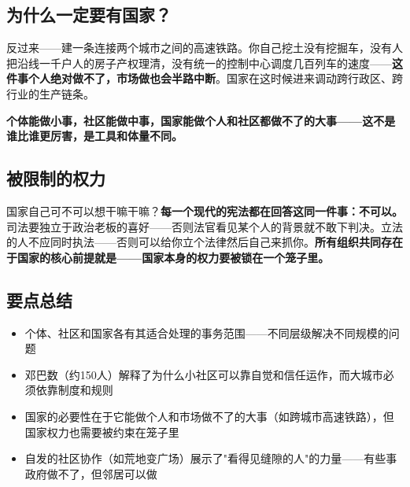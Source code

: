 \documentclass[a4paper,12pt]{ctexart}
\begin{document}
\subsection*{为什么一定要有国家？}

反过来——建一条连接两个城市之间的高速铁路。你自己挖土没有挖掘车，没有人把沿线一千户人的房子产权理清，没有统一的控制中心调度几百列车的速度——\textbf{这件事个人绝对做不了，市场做也会半路中断}。国家在这时候进来调动跨行政区、跨行业的生产链条。

\textbf{个体能做小事，社区能做中事，国家能做个人和社区都做不了的大事——这不是谁比谁更厉害，是工具和体量不同。}


\subsection*{被限制的权力}

国家自己可不可以想干嘛干嘛？\textbf{每一个现代的宪法都在回答这同一件事：不可以。}司法要独立于政治老板的喜好——否则法官看见某个人的背景就不敢下判决。立法的人不应同时执法——否则可以给你立个法律然后自己来抓你。\textbf{所有组织共同存在于国家的核心前提就是——国家本身的权力要被锁在一个笼子里。}

\subsection*{要点总结}
\begin{itemize}
  \item 个体、社区和国家各有其适合处理的事务范围——不同层级解决不同规模的问题
  \item 邓巴数（约150人）解释了为什么小社区可以靠自觉和信任运作，而大城市必须依靠制度和规则
  \item 国家的必要性在于它能做个人和市场做不了的大事（如跨城市高速铁路），但国家权力也需要被约束在笼子里
  \item 自发的社区协作（如荒地变广场）展示了"看得见缝隙的人"的力量——有些事政府做不了，但邻居可以做
\end{itemize}
\end{document}
